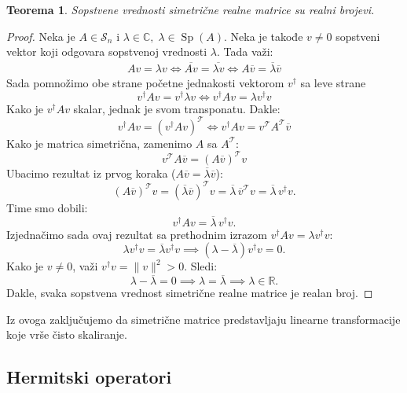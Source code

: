 \documentclass[a4paper,12pt,twoside]{report}
\newtheorem{theorem}{Teorema}[section]
\numberwithin{algorithm}{section}
\begin{document}
\begin{theorem}
    Sopstvene vrednosti simetrične realne matrice su realni brojevi.
\end{theorem}
\begin{proof}
    Neka je $A \in \mathcal{S}_n$ i $\lambda \in \mathbb{C}, \; \lambda \in \operatorname{Sp}(A)$. Neka je takođe $v \neq 0$ sopstveni vektor koji odgovara sopstvenoj
    vrednosti $\lambda$. Tada važi:
    \[ \begin{aligned}
        Av = \lambda v \iff \overline{Av} = \overline{\lambda v} \iff A\overline{v} = \overline{\lambda}\overline{v}
    \end{aligned} \]
    Sada pomnožimo obe strane početne jednakosti vektorom $v^\dagger$ sa leve strane
    \[ v^\dagger Av = v^\dagger \lambda v \iff v^\dagger Av = \lambda v^\dagger  v\]
    Kako je $v^\dagger Av$ skalar, jednak je svom transponatu. Dakle:
    \[ v^\dagger Av = (v^\dagger Av)^\mathcal{T} \iff v^\dagger Av = v^\mathcal{T} A^\mathcal{T} \overline{v} \]
    Kako je matrica simetrična, zamenimo $A$ sa $A^\mathcal{T}$:
    \[ v^\mathcal{T}A \overline{v} = (A \overline{v})^\mathcal{T}v\]
    Ubacimo rezultat iz prvog koraka ($A \overline{v} = \overline{\lambda}\overline{v}$):
    \[
        (A \overline{v})^\mathcal{T}v = (\overline{\lambda}\overline{v})^\mathcal{T}v = \overline{\lambda} \, \overline{v}^\mathcal{T} v = \overline{\lambda} \, v^\dagger v.
    \]
    Time smo dobili:
    \[
        v^\dagger Av = \overline{\lambda} \, v^\dagger v.
    \]
    Izjednačimo sada ovaj rezultat sa prethodnim izrazom $v^\dagger Av = \lambda v^\dagger v$:
    \[
        \lambda v^\dagger v = \overline{\lambda} v^\dagger v \implies (\lambda - \overline{\lambda}) v^\dagger v = 0.
    \]
    Kako je $v \neq 0$, važi $v^\dagger v = \|v\|^2 > 0$. Sledi:
    \[
        \lambda - \overline{\lambda} = 0 \implies \lambda = \overline{\lambda} \implies \lambda \in \mathbb{R}.
    \]
    Dakle, svaka sopstvena vrednost simetrične realne matrice je realan broj. 
\end{proof}

Iz ovoga zaključujemo da simetrične matrice predstavljaju linearne transformacije koje vrše čisto skaliranje.

\newpage

\subsection{Hermitski operatori}
\label{HermitskiOperatori}
\end{document}
